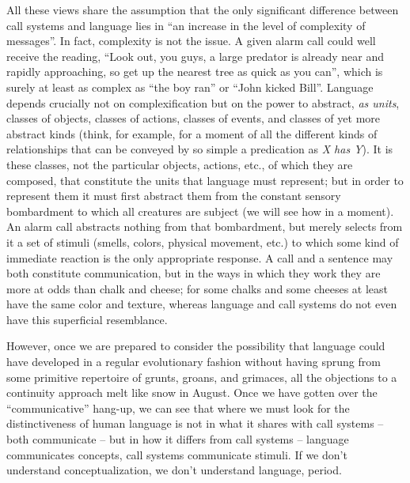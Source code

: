 All these views share the assumption that the only significant difference between call systems and language lies in ``an increase in the level of complexity of messages''. In fact, complexity is not the issue. A given alarm call could well receive the reading, ``Look out, you guys, a large predator is already near and rapidly approaching, so get up the nearest tree as quick as you can'', which is surely at least as complex as ``the boy ran'' or ``John kicked Bill''. Language depends crucially not on complexification but on the power to abstract, \textit{as units}, classes of objects, classes of actions, classes of events, and classes of yet more abstract kinds (think, for example, for a moment of all the different kinds of relationships that can be conveyed by so simple a predication as \textit{X has Y}). It is these classes, not the particular objects, actions, etc., of which they are composed, that constitute the units that language must represent; but in order to represent them it must first abstract them from the constant sensory bombardment to which all creatures are subject (we will see how in a moment). An alarm call
abstracts nothing from that bombardment, but merely selects from it a set of stimuli (smells, colors, physical movement, etc.) to which some kind of immediate reaction is the only appropriate response. A call and a sentence may both constitute communication, but in the ways in which they work they are more at odds than chalk and cheese; for some chalks and some cheeses at least have the same color and texture, whereas language and call systems do not even have this superficial resemblance.

However, once we are prepared to consider the possibility that language could have developed in a regular evolutionary fashion without having sprung from some primitive repertoire of grunts, groans, and grimaces, all the objections to a continuity approach melt like snow in August. Once we have gotten over the ``communicative'' hang-up, we can see that where we must look for the distinctiveness of human language is not in what it shares with call systems -- both communicate -- but in how it differs from call systems -- language communicates concepts, call systems communicate stimuli. If we don't understand conceptualization, we don't understand language, period.

